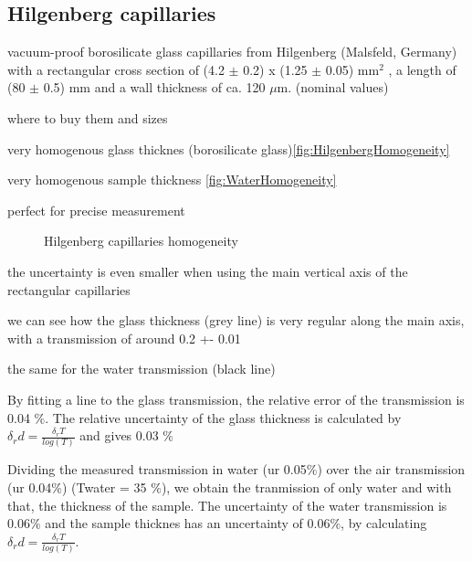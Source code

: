 \subsection{Hilgenberg capillaries}


vacuum-proof borosilicate glass capillaries from Hilgenberg (Malsfeld, Germany) with a rectangular cross section of (4.2 $\pm$ 0.2) x (1.25 $\pm$ 0.05) mm$^2$ , a length of (80 $\pm$ 0.5) mm and a wall thickness of ca. 120 $\mu$m. (nominal values)



where to buy them and sizes

very homogenous glass thicknes (borosilicate glass)\ref{fig:HilgenbergHomogeneity}

very homogenous sample thickness \ref{fig:WaterHomogeneity}

perfect for precise measurement

\begin{figure}%
	\centering
		\caption{Hilgenberg capillaries homogeneity}
\end{figure}

the uncertainty is even smaller when using the main vertical axis of the rectangular capillaries

we can see how the glass thickness (grey line) is very regular along the main axis, with a transmission of around 0.2 +- 0.01

the same for the water transmission (black line)

By fitting a line to the glass transmission, the relative error of the transmission is 0.04 $\%$. The relative uncertainty of the glass thickness is calculated by $\delta_r d = \frac{\delta_r T}{log(T)}$ and gives 0.03 $\%$

Dividing the measured transmission in water (ur 0.05$\%$) over the air transmission (ur 0.04$\%$) (Twater = 35 $\%$), we obtain the tranmission of only water and with that, the thickness of the sample. The uncertainty of the water transmission is 0.06$\%$ and the sample thicknes has an uncertainty of 0.06$\%$, by calculating $\delta_r d = \frac{\delta_r T}{log(T)}$.

